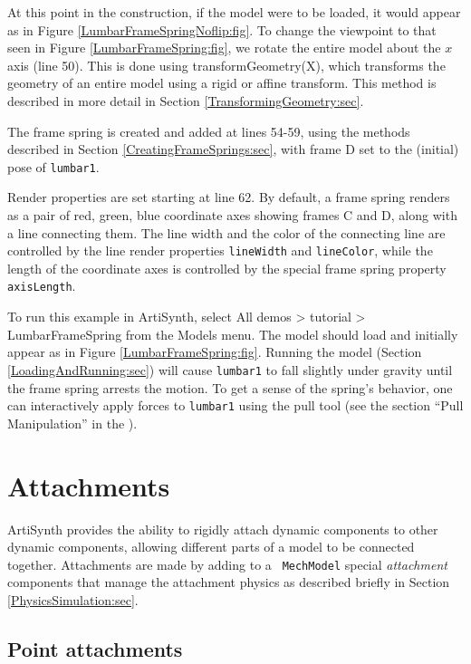 At this point in the construction, if the model were to be loaded, it
would appear as in Figure \ref{LumbarFrameSpringNoflip:fig}. To change
the viewpoint to that seen in Figure \ref{LumbarFrameSpring:fig}, we
rotate the entire model about the $x$ axis (line 50).  This is done
using
{transformGeometry(X)}, which transforms the geometry of an entire
model using a rigid or affine transform. This method is
described in more detail in Section \ref{TransformingGeometry:sec}.

The frame spring is created and added at lines 54-59, using the
methods described in Section \ref{CreatingFrameSprings:sec}, with
frame D set to the (initial) pose of {\tt lumbar1}.

Render properties are set starting at line 62. By default, a frame
spring renders as a pair of red, green, blue coordinate axes showing
frames C and D, along with a line connecting them. The line width and
the color of the connecting line are controlled by the line render
properties {\tt lineWidth} and {\tt lineColor}, while the length of
the coordinate axes is controlled by the special frame spring property
{\tt axisLength}.

To run this example in ArtiSynth, select {\sf All demos > tutorial >
LumbarFrameSpring} from the {\sf Models} menu. The model should load
and initially appear as in Figure \ref{LumbarFrameSpring:fig}.
Running the model (Section \ref{LoadingAndRunning:sec}) will cause
{\tt lumbar1} to fall slightly under gravity until the frame spring
arrests the motion. To get a sense of the spring's behavior, one can
interactively apply forces to {\tt lumbar1} using the pull tool
(see the section ``Pull Manipulation'' in the
).

\section{Attachments}
\label{Attachments:sec}

ArtiSynth provides the ability to rigidly attach dynamic components to
other dynamic components, allowing different parts of a model to be
connected together.  Attachments are made by adding to a {\tt
MechModel} special {\it attachment} components that manage the
attachment physics as described briefly in Section
\ref{PhysicsSimulation:sec}.

\subsection{Point attachments}
\label{sec:mech:pointattachments}

